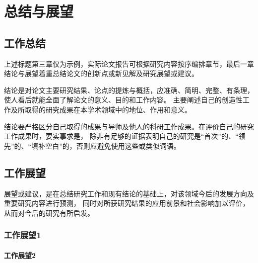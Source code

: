 \chapter{总结与展望}

\section{工作总结}

上述标题第三章仅为示例，实际论文报告可根据研究内容按序编排章节，最后一章结论与展望着重总结论文的创新点或新见解及研究展望或建议。

结论是对论文主要研究结果、论点的提炼与概括，应准确、简明、完整、有条理，使人看后就能全面了解论文的意义、目的和工作内容。
主要阐述自己的创造性工作及所取得的研究成果在本学术领域中的地位、作用和意义。

结论要严格区分自己取得的成果与导师及他人的科研工作成果。在评价自己的研究工作成果时，要实事求是，
除非有足够的证据表明自己的研究是“首次”的、“领先”的、“填补空白”的，否则应避免使用这些或类似词语。

\section{工作展望}

展望或建议，是在总结研究工作和现有结论的基础上，对该领域今后的发展方向及重要研究内容进行预测，
同时对所获研究结果的应用前景和社会影响加以评价，从而对今后的研究有所启发。

\subsection{工作展望1}
\subsubsection{工作展望2}